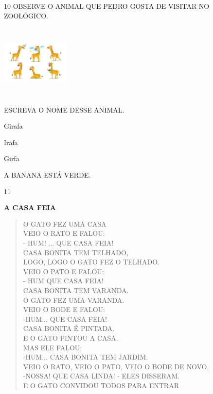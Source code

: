 
\num{10} OBSERVE O ANIMAL QUE PEDRO GOSTA DE VISITAR NO ZOOLÓGICO.

\includegraphics[width=1.36806in,height=1.47778in]{media/image219.jpg}

ESCREVA O NOME DESSE ANIMAL.

\begin{escolha}
\item Girafa

\item Irafa

\item Girfa

\item A BANANA ESTÁ VERDE.
\end{escolha}


\num{11}

\textbf{A CASA FEIA}

\begin{verse}
O GATO FEZ UMA CASA\\
VEIO O RATO E FALOU:\\
- HUM! ... QUE CASA FEIA!\\
CASA BONITA TEM TELHADO,\\
LOGO, LOGO O GATO FEZ O TELHADO.\\
VEIO O PATO E FALOU:\\
- HUM QUE CASA FEIA!\\
CASA BONITA TEM VARANDA.\\
O GATO FEZ UMA VARANDA.\\
VEIO O BODE E FALOU:\\
-HUM... QUE CASA FEIA!\\
CASA BONITA É PINTADA.\\
E O GATO PINTOU A CASA.\\
MAS ELE FALOU:\\
-HUM... CASA BONITA TEM JARDIM.\\
VEIO O RATO, VEIO O PATO, VEIO O BODE DE NOVO.\\
-NOSSA! QUE CASA LINDA! - ELES DISSERAM.\\
E O GATO CONVIDOU TODOS PARA ENTRAR
\end{verse}

